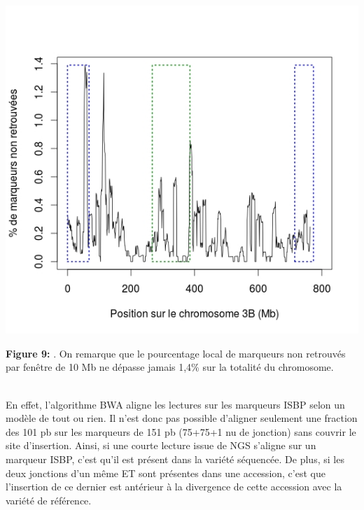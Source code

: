 \documentclass[a4paper, 12pt]{article}
\begin{document}
\begin{onehalfspace}
\begin{multicols}{2}
\begin{center}
\vspace{-0.8cm}
\includegraphics[scale=0.43]{pic_Data/fig8.jpeg}
\end{center}
\textbf{Figure 9:} . On remarque que le pourcentage local de marqueurs non retrouvés par fenêtre de 10 Mb ne dépasse jamais 1,4\% sur la totalité du chromosome.\\ ~\\
\end{multicols}
\vfill
\addtocounter{page}{-1}
\newpage

En effet, l'algorithme BWA aligne les lectures sur les marqueurs ISBP selon un modèle de tout ou rien. Il n'est donc pas possible d'aligner seulement une fraction des 101 pb sur les marqueurs de 151 pb (75+75+1 nu de jonction) sans couvrir le site d'insertion. Ainsi, si une courte lecture issue de NGS s'aligne sur un marqueur ISBP, c'est qu'il est présent dans la variété séquencée. De plus, si les deux jonctions d'un même ET sont présentes dans une accession, c'est que l'insertion de ce dernier est antérieur à la divergence de cette accession avec la variété de référence.\\


\end{onehalfspace}
\end{document}
